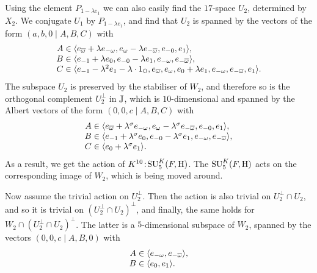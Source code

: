 Using the element $P_{1 - \lambda e_1}$ we can also easily find the $17$-space $U_2$, determined
by $X_2$. We conjugate $U_1$ by $P_{1-\lambda e_1}$, and find that $U_2$ is spanned by the vectors
of the form $(a,b,0\mid A,B,C)$ with
\begin{equation}
	\begin{array}{r@{\;}c@{\;}l}
		A & \in & \langle e_{\bar{\omega}}+\lambda e_{-\omega}, e_{\omega}-\lambda e_{-\bar{\omega}}
		, e_{-0}, e_1
		\rangle, \\
		B & \in & \langle e_{-1}+\lambda e_0, e_{-0} - \lambda e_1,
	e_{-\omega}, e_{-\bar{\omega}}  \rangle, \\
		C & \in & \langle e_{-1}-\lambda^2 e_1 - \lambda \cdot 1_{\O}, e_{\bar{\omega}}, e_{\omega},
	e_0 + \lambda e_1, e_{-\omega}, e_{-\bar{\omega}}, e_1 \rangle.
	\end{array}
\end{equation}
The subspace $U_2$ is preserved by the stabiliser of $W_2$, and therefore so is the orthogonal 
complement $U_2^{\perp}$ in $\mathbb{J}$, 
which is $10$-dimensional and spanned by the Albert vectors of the form
$(0,0,c \mid A,B,C)$ with
\begin{equation}
	\begin{array}{r@{\;}c@{\;}l}
		A & \in & \langle e_{\bar{\omega}} + \lambda^{\s} e_{-\omega}, e_{\omega} - \lambda^{\s} 
					e_{-\bar{\omega}}, e_{-0}, e_1 \rangle, \\
		
		B & \in & \langle e_{-1} + \lambda^{\s} e_0, e_{-0} - \lambda^{\s} e_1, 
					e_{-\omega}, e_{-\bar{\omega}} \rangle, \\
					
		C & \in & \langle e_0 + \lambda^{\s} e_1 \rangle. 
	\end{array}
\end{equation}
As a result, we get the action of $K^{10}\mathord{{\;\!{:}\;\!}}\mathrm{SU}_5^K(F,\mathrm{H})$. The $\mathrm{SU}_5^K(F,\mathrm{H})$ acts 
on the corresponding image of $W_2$, which is being moved around. 

Now assume the trivial action on $U_2^{\perp}$. Then the action is also trivial on 
$U_2^{\perp} \cap U_2$, and so it is trivial on $(U_2^{\perp} \cap U_2)^{\perp}$,
and finally, the same holds for $W_2 \cap (U_2^{\perp} \cap U_2)^{\perp}$. 
The latter is a $5$-dimensional subspace of $W_2$, spanned by the vectors
$(0,0,c\mid A,B,0)$ with
\begin{equation}
	\begin{array}{r@{\;}c@{\;}l}
		A & \in & \langle e_{-\omega}, e_{-\bar{\omega}} \rangle, \\
		B & \in & \langle e_{0}, e_1 \rangle.
	\end{array}
\end{equation}

